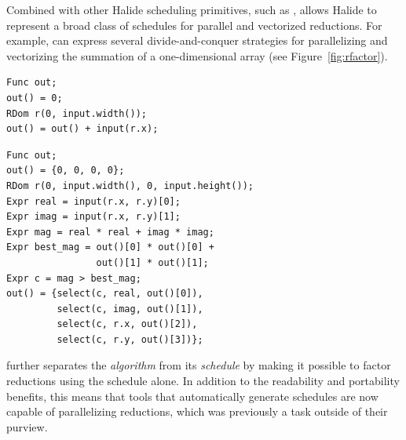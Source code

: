 Combined with other Halide scheduling primitives, such as ,  allows Halide to represent a broad class of schedules for parallel and vectorized reductions. For example,  can express several divide-and-conquer strategies for parallelizing and vectorizing the summation of a one-dimensional array (see Figure~\ref{fig:rfactor}).

\begin{lstlisting}[float,
caption = {Halide sum reduction over a one-dimensional vector.}, label={lst:sum}]
Func out;
out() = 0;
RDom r(0, input.width());
out() = out() + input(r.x);
\end{lstlisting}
\begin{lstlisting}[float,
caption = {Halide reduction which finds the complex number with the greatest magnitude and its location in a two-dimensional array.}, label={lst:complex_magnitude}]
Func out;
out() = {0, 0, 0, 0};
RDom r(0, input.width(), 0, input.height());
Expr real = input(r.x, r.y)[0];
Expr imag = input(r.x, r.y)[1];
Expr mag = real * real + imag * imag;
Expr best_mag = out()[0] * out()[0] +
                out()[1] * out()[1];
Expr c = mag > best_mag;
out() = {select(c, real, out()[0]),
         select(c, imag, out()[1]),
         select(c, r.x, out()[2]),
         select(c, r.y, out()[3])};
\end{lstlisting}

 further separates the \emph{algorithm} from its \emph{schedule} by making it possible to factor reductions using the schedule alone. In addition to the readability and portability benefits, this means that tools that automatically generate schedules \cite{Mullapudi:2016:ASH:2897824.2925952, Ragan-Kelley:2013:HLC:2491956.2462176} are now capable of parallelizing reductions, which was previously a task outside of their purview.

